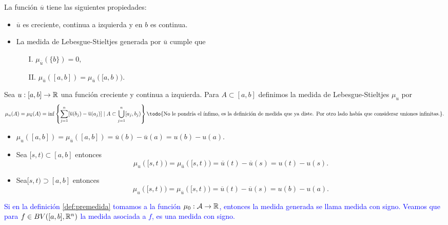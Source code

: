     
\begin{obs} La función $\overline{u}$ tiene las siguientes propiedades:
	\begin{itemize}
		\item $\overline{u}$ es creciente, continua a izquierda y en $b$ es continua.
		\item La medida de Lebesgue-Stieltjes generada por $\overline{u}$ cumple que 
		\begin{enumerate}
			\item[I.] $\mu_{\overline{u}}(\{b\})=0,$
			\item[II.] $\mu_{\overline{u}}([a,b])=\mu_{\overline{u}}([a,b)).$
		\end{enumerate}
	\end{itemize}
\end{obs}
\begin{defi}
	Sea $u:[a,b]\to\mathbb{R}$ una función  creciente y continua a izquierda. Para $A\subset[a,b]$  definimos la medida de Lebesgue-Stieltjes $\mu_u$ por 
	\begin{equation*}
 
	\mu_{u}(A)=\mu_{\overline{u}}(A)=\inf\left\lbrace \sum_{ j=1 }^n[\overline{u}(b_j)-\overline{u}(a_j)] \mid A\subset \bigcup_{j=1}^n[a_j,b_j)\right\rbrace\textrm{\todo{No le pondría el ínfimo, es la definición de medida que ya diste. Por otro lado había que considerar uniones infinitas.}}. 
 \end{equation*}
\end{defi}

\begin{obs}  \vphantom{a} \reversemarginpar {}
 
	\begin{itemize}
        \item $\mu_{u}([a,b])=\mu_{\overline{u}}([a,b])=\overline{u}(b)-\overline{u}(a)=u(b)-u(a)$.
		\item Sea $[s,t)\subset[a,b]$ entonces $$\mu_{u}([s,t))=\mu_{\overline{u}}([s,t))=\overline{u}(t)-\overline{u}(s)=u(t)-u(s).$$
		
		\item Sea$[s,t)\supset[a,b]$ entonces
		$$\mu_{u}([s,t))=\mu_{\overline{u}}([s,t))=\overline{u}(t)-\overline{u}(s)=u(b)-u(a).$$
	\end{itemize}
\end{obs}






 
\textcolor{blue}{Si en la definición \ref{def:premedida} tomamos a la función $\mu_0:\mathcal{A}\to \mathbb{R}$, entonces la medida generada se llama medida con signo. Veamos que para $f\in BV([a,b],\mathbb{R}^n)$ la medida asociada a $f$, es una medida con signo.}

